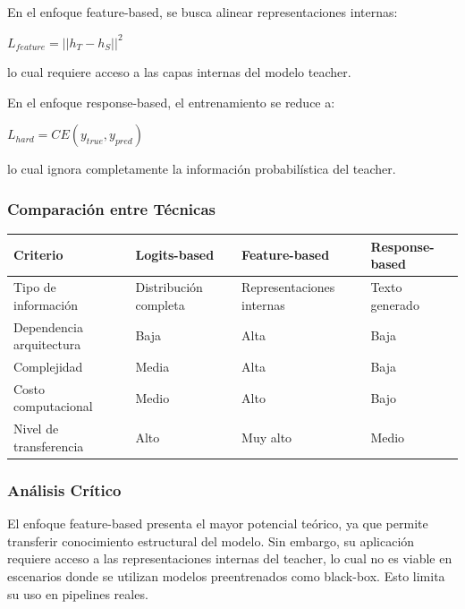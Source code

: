 \documentclass[12pt]{article}
\begin{document}
	En el enfoque feature-based, se busca alinear representaciones internas:
	
	\begin{center}
		$L_{feature} = ||h_T - h_S||^2$
	\end{center}
	
	lo cual requiere acceso a las capas internas del modelo teacher.
	
	En el enfoque response-based, el entrenamiento se reduce a:
	
	\begin{center}
		$L_{hard} = CE(y_{true}, y_{pred})$
	\end{center}
	
	lo cual ignora completamente la información probabilística del teacher.
	

	
	\subsubsection{Comparación entre Técnicas}
	
	\begin{longtable}{|l|l|l|l|}
		\hline
		\textbf{Criterio} & \textbf{Logits-based} & \textbf{Feature-based} & \textbf{Response-based} \\
		\hline
		Tipo de información & Distribución completa & Representaciones internas & Texto generado \\
		\hline
		Dependencia arquitectura & Baja & Alta & Baja \\
		\hline
		Complejidad & Media & Alta & Baja \\
		\hline
		Costo computacional & Medio & Alto & Bajo \\
		\hline
		Nivel de transferencia & Alto & Muy alto & Medio \\
		\hline
	\end{longtable}
	

	
	\subsubsection{Análisis Crítico}
	
	El enfoque feature-based presenta el mayor potencial teórico, ya que permite transferir conocimiento estructural del modelo. Sin embargo, su aplicación requiere acceso a las representaciones internas del teacher, lo cual no es viable en escenarios donde se utilizan modelos preentrenados como black-box. Esto limita su uso en pipelines reales.
	
\end{document}
